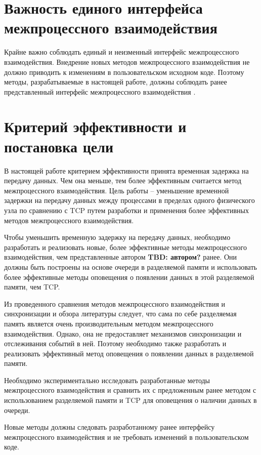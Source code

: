 \section{Важность единого интерфейса межпроцессного взаимодействия}

Крайне важно соблюдать единый и неизменный интерфейс межпроцессного взаимодействия. Внедрение новых методов межпроцессного взаимодействия не должно приводить к изменениям в пользовательском исходном коде. Поэтому методы, разрабатываемые в настоящей работе, должны соблюдать ранее представленный интерфейс межпроцессного взаимодействия \cite{GubarevKMU18}.

\finishrelatedwork

\section{Критерий эффективности и постановка цели}

В настоящей работе критерием эффективности принята временная задержка на передачу данных. Чем она меньше, тем более эффективным считается метод межпроцессного взаимодействия.
Цель работы -- уменьшение временной задержки на передачу данных между процессами в пределах одного физического узла по сравнению с TCP путем разработки и применения более эффективных методов межпроцессного взаимодействия.

Чтобы уменьшить временную задержку на передачу данных, необходимо разработать и реализовать новые, более эффективные методы межпроцессного взаимодействия, чем представленные автором \textbf{TBD: автором?} ранее. Они должны быть построены на основе очереди в разделяемой памяти и использовать более эффективные методы оповещения о появлении данных в этой разделяемой памяти, чем TCP.

Из проведенного сравнения методов межпроцессного взаимодействия и синхронизации и обзора литературы следует, что сама по себе разделяемая память является очень производительным методом межпроцессного взаимодействия. Однако, она не предоставляет механизмов синхронизации и отслеживания событий в ней. Поэтому необходимо также разработать и реализовать эффективный метод оповещения о появлении данных в разделяемой памяти.

Необходимо экспериментально исследовать разработанные методы межпроцессного взаимодействия и сравнить их с предложенным ранее методом с использованием разделяемой памяти и TCP для оповещения о наличии данных в очереди.

Новые методы должны следовать разработанному ранее интерфейсу межпроцессного взаимодействия и не требовать изменений в пользовательском коде.